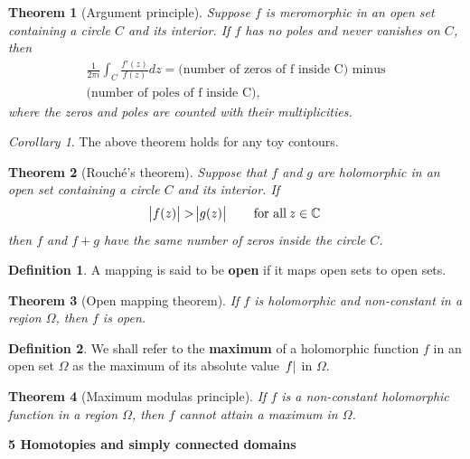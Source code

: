 \documentclass{article}
\newtheorem{theorem}{Theorem}
\theoremstyle{definition}
\newtheorem{definition}{Definition}[section]
\theoremstyle{remark}
\newtheorem{corollary}{Corollary}[theorem]
\begin{document}
    \begin{theorem}[Argument principle]
        Suppose $f$ is meromorphic in an open set containing a circle $C$ and its interior. If $f$ has no poles and never vanishes
        on $C$, then
        \begin{align*}
            \frac{1}{2\pi i}\int_C \frac{f'(z)}{f(z)}dz = (\text{number of zeros of f inside C) minus} \\
            \text{(number of poles of f inside C),}
        \end{align*}
        where the zeros and poles are counted with their multiplicities.
    \end{theorem}

    \begin{corollary}
        The above theorem holds for any toy contours.
    \end{corollary}

    \begin{theorem}[Rouché's theorem]
        Suppose that $f$ and $g$ are holomorphic in an open set containing a circle $C$ and its interior. If
        \[ \abs{f(z)} > \abs{g(z)} \qquad\text{for all}\:z\in\mathbb{C} \]
        then $f$ and $f+g$ have the same number of zeros inside the circle $C$.
    \end{theorem}

    \begin{definition}
        A mapping is said to be \textbf{open} if it maps open sets to open sets.
    \end{definition}

    \begin{theorem}[Open mapping theorem]
        If $f$ is holomorphic and non-constant in a region $\Omega$, then $f$ is open.
    \end{theorem}

    \begin{definition}
        We shall refer to the \textbf{maximum} of a holomorphic function $f$ in an open set $\Omega$ as the maximum of its
        absolute value $\abs{f}$ in $\Omega$.
    \end{definition}

    \begin{theorem}[Maximum modulas principle]
        If $f$ is a non-constant holomorphic function in a region $\Omega$, then $f$ cannot attain a maximum in $\Omega$.
    \end{theorem}

    \newpage

    \textbf{5 Homotopies and simply connected domains}
\end{document}
